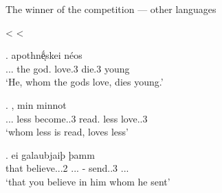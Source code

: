 \documentclass[xcolor=dvipsnames,10pt]{beamer}
\begin{document}
\begin{frame}{The winner of the competition --- other languages}

\pause

 <  < 

\pause

\exg.     apothnḗͅskei néos\\
...\textcolor{LimeGreen}{} the god. love.3\textcolor{LimeGreen}{\scsub{[acc]}} die.3\textcolor{Turquoise}{\scsub{[nom]}} young\\
`He, whom the gods love, dies young.' \label{ex:ag-nom-acc}

\pause

\exg.    , min minnot\\
...\textcolor{red}{} less become..3 read.\textcolor{red}{\scsub{[dat]}} less love..3\textcolor{Turquoise}{\scsub{[nom]}}\\
`whom less is read, loves less' \label{ex:ohg-nom-dat}

\pause

\exg. ei galaubjaiþ þamm   \\
that believe...2\textcolor{red}{\scsub{[dat]}} ...\textcolor{red}{} - {send}..3\textcolor{LimeGreen}{\scsub{[acc]}} ...\\
`that you believe in him whom he sent' \label{ex:gothic-dat-acc}

\end{frame}
\end{document}
